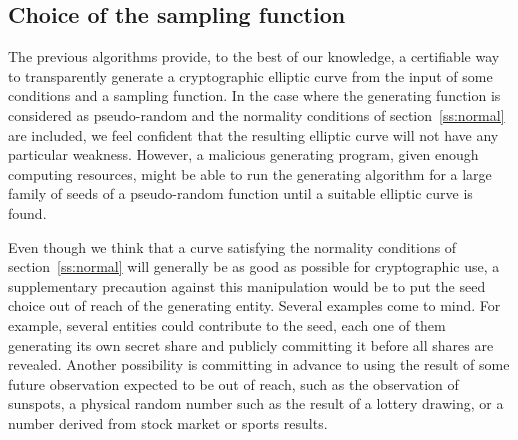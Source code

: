 \documentclass[twocolumn,letterpaper]{article}
\begin{document}
\subsection{Choice of the sampling function}

The previous algorithms provide, to the best of our knowledge,
a certifiable way to transparently generate a cryptographic elliptic curve
from the input of some conditions and a sampling function.
In the case where the generating function is considered as pseudo-random
and the normality conditions of section~\ref{ss:normal} are included,
we feel confident that the resulting elliptic curve
will not have any particular weakness.
However, a malicious generating program, given enough computing resources,
might be able to run the generating algorithm
for a large family of seeds of a pseudo-random function
until a suitable elliptic curve is found.

Even though we think that a curve satisfying the normality conditions
of section~\ref{ss:normal} will generally be as good as possible
for cryptographic use,
a supplementary precaution against this manipulation
would be to put the seed choice out of reach of the generating entity.
Several examples come to mind.
For example, several entities could contribute to the seed,
each one of them generating its own secret share
and publicly committing it before all shares are revealed.
Another possibility is committing in advance to using
the result of some future observation expected to be out of reach,
such as the observation of sunspots,
a physical random number such as the result of a lottery drawing,
or a number derived from stock market or sports results.



\end{document}
